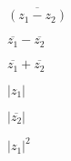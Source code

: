 \message{ !name(Guia-Formativa-1-3TP-Numeros-Complejos.tex)}\documentclass[twocolumns,12pt,addpoints,x11names]{exam}
\begin{document}
\begin{questions}
\question $\overline{(z_1-z_2)}$
   \begin{solutionbox}{1in}
    
  \end{solutionbox}

\question $\overline{z_1}-\overline{z_2}$
   \begin{solutionbox}{1in}
    
  \end{solutionbox}

\question $\overline{z_1}+\overline{z_2}$
   \begin{solutionbox}{1in}
    
  \end{solutionbox}

\question $|z_1|$
   \begin{solutionbox}{1in}
    
  \end{solutionbox}

\question $|\overline{z_2}|$
   \begin{solutionbox}{1in}
    
  \end{solutionbox}

\question $|z_1|^{2}$
  \begin{solutionbox}{1in}
    
  \end{solutionbox}
  
\end{questions}
\end{document}
